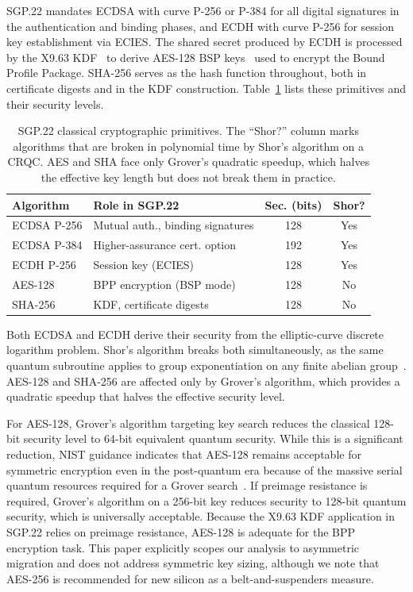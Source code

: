 \documentclass[a4paper,fleqn]{cas-sc}
\begin{document}
SGP.22 mandates ECDSA with curve P-256 or P-384 for all digital
signatures in the authentication and binding phases, and ECDH with curve
P-256 for session key establishment via ECIES. The shared secret
produced by ECDH is processed by the X9.63 KDF~\cite{nist_sp800_56a}
to derive AES-128 BSP keys~\cite{nist_sp800_38b} used to encrypt the
Bound Profile Package. SHA-256 serves as the hash function throughout,
both in certificate digests and in the KDF construction. Table~\ref{tab:classical_primitives}
lists these primitives and their security levels.

\begin{table}[!htb]
\caption{SGP.22 classical cryptographic primitives. The ``Shor?'' column
  marks algorithms that are broken in polynomial time by Shor's algorithm
  on a CRQC. AES and SHA face only Grover's quadratic speedup, which
  halves the effective key length but does not break them in practice.}
\label{tab:classical_primitives}
\centering
\footnotesize
\setlength{\tabcolsep}{4pt}
\renewcommand{\arraystretch}{1.1}
\begin{tabularx}{\columnwidth}{@{}l >{\raggedright\arraybackslash}X cc@{}}
\toprule
\textbf{Algorithm} & \textbf{Role in SGP.22} & \textbf{Sec. (bits)} & \textbf{Shor?} \\
\midrule
ECDSA P-256 & Mutual auth., binding signatures & 128 & Yes \\
ECDSA P-384 & Higher-assurance cert. option & 192 & Yes \\
ECDH P-256  & Session key (ECIES) & 128 & Yes \\
AES-128     & BPP encryption (BSP mode) & 128 & No \\
SHA-256     & KDF, certificate digests & 128 & No \\
\bottomrule
\end{tabularx}
\end{table}

Both ECDSA and ECDH derive their security from the elliptic-curve
discrete logarithm problem. Shor's algorithm breaks both simultaneously,
as the same quantum subroutine applies to group exponentiation on any
finite abelian group~\cite{proos2003shor}. AES-128 and SHA-256 are
affected only by Grover's algorithm, which provides a quadratic speedup
that halves the effective security level.

For AES-128, Grover's algorithm targeting key search reduces the classical
128-bit security level to 64-bit equivalent quantum security. While this is
a significant reduction, NIST guidance indicates that AES-128 remains
acceptable for symmetric encryption even in the post-quantum era because of the
massive serial quantum resources required for a Grover search~\cite{nist2024pqc}.
If preimage resistance is required, Grover's algorithm on a 256-bit key reduces
security to 128-bit quantum security, which is universally acceptable. Because
the X9.63 KDF application in SGP.22 relies on preimage resistance, AES-128 is
adequate for the BPP encryption task. This paper explicitly scopes our analysis
to asymmetric migration and does not address symmetric key sizing, although we
note that AES-256 is recommended for new silicon as a belt-and-suspenders measure.
\end{document}
